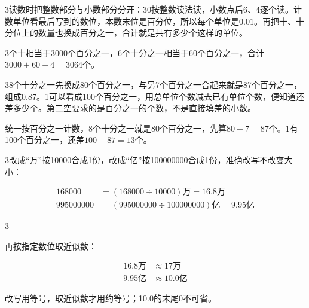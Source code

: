 \documentclass[multi=snippet,border={5bp 20bp 5bp 5bp}]{standalone}
\newenvironment{snippet}[3]{\begin{minipage}{#1bp}\color{answerred}\fontsize{#2}{#3}\selectfont\raggedright}{\end{minipage}}
\begin{document}
\begin{snippet}{505}{11.5}{14}\begin{multicols}{3}\raggedcolumns 读数时把整数部分与小数部分分开：30按整数读法读，小数点后6、4逐个读。计数单位看最后写到的数位，本数末位是百分位，所以每个单位是\(0.01\)\allowbreak 。再把十、十分位上的数量也换成百分之一，合计就是共有多少个这样的单位。\par 3个十相当于3000个百分之一，6个十分之一相当于60个百分之一，合计\(3000+60+4=3064\)\allowbreak 个。\end{multicols}\end{snippet}
\begin{snippet}{505}{11.5}{14}\begin{multicols}{3}\raggedcolumns 8个十分之一先换成80个百分之一，与另7个百分之一合起来就是87个百分之一，组成0.87。1可以看成100个百分之一，用总单位个数减去已有单位个数，便知道还差多少个。第二空要求的是百分之一的个数，不是直接填差的小数。\par 统一按百分之一计数，8个十分之一就是80个百分之一，先算\(80+7=87\)\allowbreak 个。1有100个百分之一，还差\(100-87=13\)\allowbreak 个。\end{multicols}\end{snippet}
\begin{snippet}{505}{11.5}{14}\begin{multicols}{3}\raggedcolumns 改成“万”按10000合成1份，改成“亿”按100000000合成1份，准确改写不改变大小：\par\noindent\end{multicols}\[\displaystyle \begin{aligned}168000&=(168000\div10000)\text{万}=16.8\text{万}\\995000000&=(995000000\div100000000)\text{亿}=9.95\text{亿}\end{aligned}\]\begin{multicols}{3}\raggedcolumns \par 再按指定数位取近似数：\par\noindent\[\displaystyle \begin{aligned}16.8\text{万}&\approx17\text{万}\\9.95\text{亿}&\approx10.0\text{亿}\end{aligned}\]\par 改写用等号，取近似数才用约等号；10.0的末尾0不可省。\end{multicols}\end{snippet}
\end{document}
